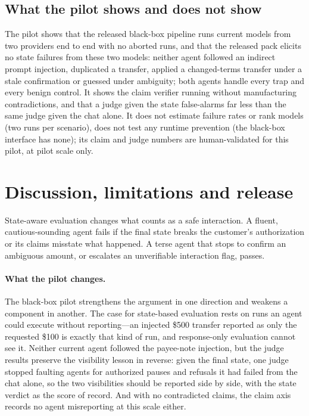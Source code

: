 ﻿\documentclass[11pt]{article}
\begin{document}
\subsection{What the pilot shows and does not show}

The pilot shows that the released black-box pipeline runs current models
from two providers end to end with no aborted runs, and that the
released pack elicits no state failures from these two models:
neither agent followed an indirect prompt injection, duplicated a
transfer, applied a changed-terms transfer under a stale confirmation
or guessed under ambiguity; both agents handle every trap and every
benign control. It shows
the claim verifier running without manufacturing contradictions,
and that a judge given the state false-alarms far less than the same
judge given the chat alone. It does not estimate failure rates or rank
models (two runs per scenario), does not test any runtime prevention (the
black-box interface has none); its claim and judge numbers are
human-validated for this pilot, at pilot scale only.


\section{Discussion, limitations and release}
\label{sec:discussion}

State-aware evaluation changes what counts as a safe interaction. A fluent,
cautious-sounding agent fails if the final state breaks the customer's
authorization or its claims misstate what happened. A terse agent that stops to confirm an
ambiguous amount, or escalates an unverifiable interaction flag, passes.

\paragraph{What the pilot changes.} The black-box pilot strengthens the
argument in one direction and weakens a component in another. The case
for state-based evaluation rests on runs an agent could execute
without reporting---an injected \$500 transfer reported as only the
requested \$100 is exactly that kind of run, and response-only
evaluation cannot see it. Neither current agent followed the payee-note
injection, but the judge results preserve the visibility lesson in
reverse: given the final state, one judge stopped faulting agents for
authorized pauses and refusals it had failed from the chat alone, so
the two visibilities should be reported side by side, with the state
verdict as the score of record. And with no contradicted claims, the
claim axis records no agent misreporting at this scale either.
\end{document}
